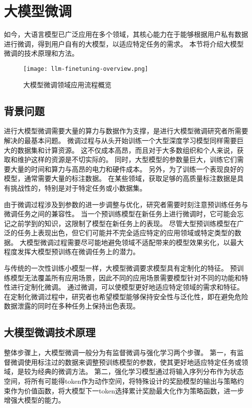 \section{大模型微调}

如今，大语言模型已广泛应用在多个领域，其核心能力在于能够根据用户私有数据进行微调，得到用户自有的大模型，以适应特定任务的需求。
本节将介绍大模型微调的技术原理和方法。

\begin{figure}
  \centering
  \texttt{[image: llm-finetuning-overview.png]}
  \caption{大模型微调领域应用流程概览}
  \label{fig:finetuning}
\end{figure}

\subsection{背景问题}

进行大模型微调需要大量的算力与数据作为支撑，是进行大模型微调研究者所需要解决的最基本问题。
微调过程与从头开始训练一个大型深度学习模型同样需要巨大的数据集和计算资源。
这不仅成本高昂，而且对于大多数组织和个人来说，获取和维护这样的资源是不切实际的。
同时，大型模型的参数量巨大，训练它们需要大量的时间和算力与高昂的电力和硬件成本。
另外，为了训练一个表现良好的模型，通常需要大量的标注数据。
在某些领域，获取足够的高质量标注数据是具有挑战性的，特别是对于特定任务或小数据集。

由于微调过程涉及到参数的进一步调整与优化，研究者需要时刻注意预训练任务与微调任务之间的兼容性。
当一个预训练模型在新任务上进行微调时，它可能会忘记之前学到的知识，这限制了模型在新任务上的表现。
尽管大型预训练模型在广泛的任务上表现出色，但它们可能并不完全适应特定的应用领域或特定类型的数据。
大模型微调过程需要尽可能地避免领域不适配带来的模型效果劣化，以最大程度发挥大模型预训练在微调任务上的潜力。

与传统的一次性训练小模型一样，大模型微调要求模型具有定制化的特征。
预训练模型无法覆盖所有应用场景，因此不同的应用场景需要模型针对不同的功能和特性进行定制化微调。
通过微调，可以使模型更好地适应特定领域的需求和特征。
在定制化微调过程中，研究者也希望模型能够保持安全性与泛化性，即在避免危险数据泄露的同时在多种任务上保持出色表现。

\subsection{大模型微调技术原理}

整体步骤上，大模型微调一般分为有监督微调与强化学习两个步骤。
第一，有监督微调使用标注过的数据来调整预训练模型的参数，使其更好地适应特定任务或领域，是较为经典的微调方法。
第二，强化学习模型通过将输入序列分布作为状态空间，将所有可能得token作为动作空间，将特殊设计的奖励模型的输出与策略约束作为价值函数，将大模型下一token选择累计奖励最大化作为策略函数，进一步增强大模型的能力。

